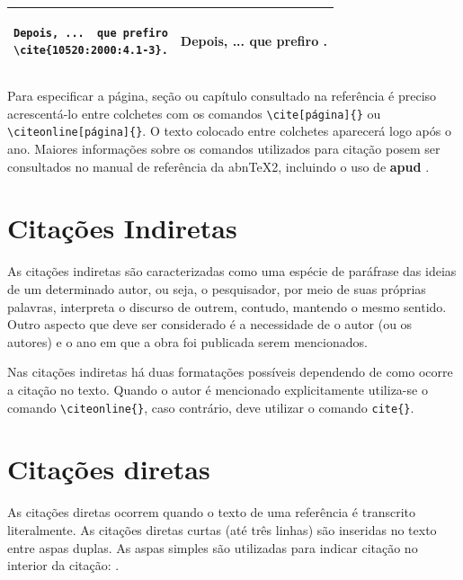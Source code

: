 \begin{quadro}[!ht]
\begin{tabular}{|c|c|}
\begin{minipage}[t]{8cm}
\vspace{5pt}
\begin{verbatim}
Depois, ...  que prefiro
\cite{10520:2000:4.1-3}.
\end{verbatim}
\vspace{5pt}
\end{minipage}
&
\begin{minipage}[t]{6cm}
\vspace{5pt}
Depois, {...} que prefiro \cite{10520:2000:4.1-3}.
\vspace{5pt}
\end{minipage}\\ \hline
\end{tabular}
\end{quadro}

Para especificar a página, seção ou capítulo consultado na referência é preciso acrescentá-lo entre colchetes com os comandos \verb|\cite[página]{}| ou \verb|\citeonline[página]{}|. O texto colocado entre colchetes aparecerá logo após o ano. Maiores informações sobre os comandos utilizados para citação posem ser consultados no manual de referência da abnTeX2, incluindo o uso de \textbf{apud} \cite{abntex2cite-alf}.

\section{Citações Indiretas}

As citações indiretas são caracterizadas como uma espécie de paráfrase das ideias de um determinado autor, ou seja, o pesquisador, por meio de suas próprias palavras, interpreta o discurso de outrem, contudo, mantendo o mesmo sentido. Outro aspecto que deve ser considerado é a necessidade de o autor (ou os autores) e o ano em que a obra foi publicada serem mencionados. 

Nas citações indiretas há duas formatações possíveis dependendo de como ocorre a citação no texto. Quando o autor é mencionado explicitamente utiliza-se o comando \verb|\citeonline{}|, caso contrário, deve utilizar o comando \verb|cite{}|. 

\section{Citações diretas}
\label{sec-citacao}

As citações diretas ocorrem quando o texto de uma referência é transcrito literalmente. As citações diretas curtas (até três linhas) são inseridas no texto entre aspas duplas. As aspas simples são utilizadas para indicar citação no interior da citação:  \cite[sec.~5]{NBR10520:2002}.

